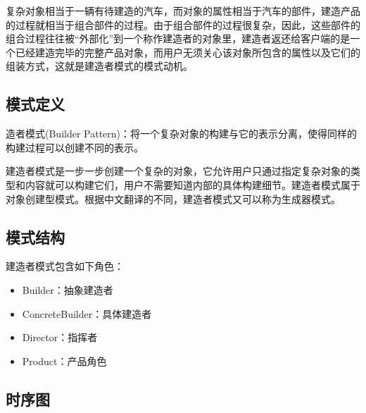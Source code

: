 \documentclass[letterpaper,10pt,english]{sphinxmanual}
\begin{document}
\sphinxAtStartPar
复杂对象相当于一辆有待建造的汽车，而对象的属性相当于汽车的部件，建造产品的过程就相当于组合部件的过程。由于组合部件的过程很复杂，因此，这些部件的组合过程往往被“外部化”到一个称作建造者的对象里，建造者返还给客户端的是一个已经建造完毕的完整产品对象，而用户无须关心该对象所包含的属性以及它们的组装方式，这就是建造者模式的模式动机。


\subsection{模式定义}
\label{\detokenize{creational_patterns/builder:id4}}
\sphinxAtStartPar
造者模式(Builder Pattern)：将一个复杂对象的构建与它的表示分离，使得同样的构建过程可以创建不同的表示。

\sphinxAtStartPar
建造者模式是一步一步创建一个复杂的对象，它允许用户只通过指定复杂对象的类型和内容就可以构建它们，用户不需要知道内部的具体构建细节。建造者模式属于对象创建型模式。根据中文翻译的不同，建造者模式又可以称为生成器模式。


\subsection{模式结构}
\label{\detokenize{creational_patterns/builder:id5}}
\sphinxAtStartPar
建造者模式包含如下角色：
\begin{itemize}
\item {} 
\sphinxAtStartPar
Builder：抽象建造者

\item {} 
\sphinxAtStartPar
ConcreteBuilder：具体建造者

\item {} 
\sphinxAtStartPar
Director：指挥者

\item {} 
\sphinxAtStartPar
Product：产品角色

\end{itemize}

\noindent{}


\subsection{时序图}
\label{\detokenize{creational_patterns/builder:id6}}
\noindent{}
\end{document}
